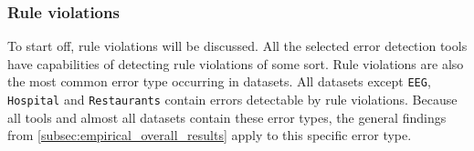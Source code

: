 \subsubsection{Rule violations}
To start off, rule violations will be discussed. All the selected error detection tools have capabilities of detecting rule violations of some sort. Rule violations are also the most common error type occurring in datasets. All datasets except \verb|EEG|, \verb|Hospital| and \verb|Restaurants| contain errors detectable by rule violations. 
Because all tools and almost all datasets contain these error types, the general findings from \autoref{subsec:empirical_overall_results} apply to this specific error type. 

